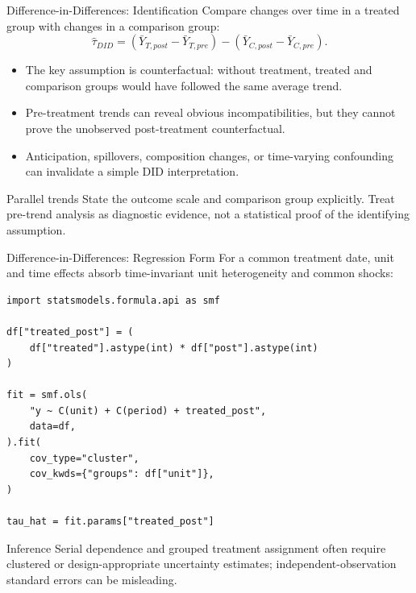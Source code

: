 \documentclass[aspectratio=169,11pt]{beamer}
\begin{document}
\begin{frame}{Difference-in-Differences: Identification}
Compare changes over time in a treated group with changes in a comparison group:
\[
  \hat\tau_{DID}
  = (\bar Y_{T,post}-\bar Y_{T,pre})
  -(\bar Y_{C,post}-\bar Y_{C,pre}).
\]

\begin{itemize}
  \item The key assumption is counterfactual: without treatment, treated and comparison groups would have followed the same average trend.
  \item Pre-treatment trends can reveal obvious incompatibilities, but they cannot prove the unobserved post-treatment counterfactual.
  \item Anticipation, spillovers, composition changes, or time-varying confounding can invalidate a simple DID interpretation.
\end{itemize}

\begin{alertblock}{Parallel trends}
State the outcome scale and comparison group explicitly. Treat pre-trend analysis as diagnostic evidence, not a statistical proof of the identifying assumption.
\end{alertblock}
\end{frame}

\begin{frame}[fragile]{Difference-in-Differences: Regression Form}
For a common treatment date, unit and time effects absorb time-invariant unit heterogeneity and common shocks:

\begin{lstlisting}[style=code,basicstyle=\ttfamily\small]
import statsmodels.formula.api as smf

df["treated_post"] = (
    df["treated"].astype(int) * df["post"].astype(int)
)

fit = smf.ols(
    "y ~ C(unit) + C(period) + treated_post",
    data=df,
).fit(
    cov_type="cluster",
    cov_kwds={"groups": df["unit"]},
)

tau_hat = fit.params["treated_post"]
\end{lstlisting}

\begin{block}{Inference}
Serial dependence and grouped treatment assignment often require clustered or design-appropriate uncertainty estimates; independent-observation standard errors can be misleading.
\end{block}
\end{frame}
\end{document}
